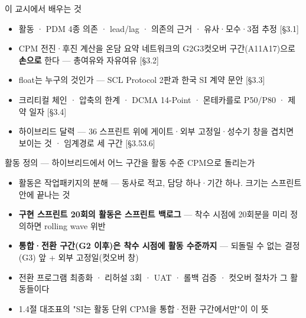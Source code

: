 \begin{frame}{이 교시에서 배우는 것}
\begin{itemize}
\item 활동 · PDM 4종 의존 · lead/lag · 의존의 근거 · 유사·모수·3점 추정 [§3.1]
\item CPM 전진·후진 계산을 온담 요약 네트워크의 G2\ra{}G3\ra{}컷오버 구간(A11\til{}A17)으로 \textbf{손으로} 한다 — 총여유와 자유여유 [§3.2]
\item float는 누구의 것인가 — SCL Protocol 2판과 한국 SI 계약 문안 [§3.3]
\item 크리티컬 체인 · 압축의 한계 · DCMA 14-Point · 몬테카를로 P50/P80 · 제약 일자 [§3.4]
\item 하이브리드 달력 — 36 스프린트 위에 게이트·외부 고정일·성수기 창을 겹치면 보이는 것 · 임계경로 세 구간 [§3.5\til{}3.6]
\end{itemize}
\end{frame}

\begin{frame}{활동 정의 — 하이브리드에서 어느 구간을 활동 수준 CPM으로 돌리는가}
\begin{itemize}
\item 활동은 작업패키지의 분해 — 동사로 적고, 담당 하나·기간 하나. 크기는 스프린트 안에 끝나는 것
\item \textbf{구현 스프린트 20회의 활동은 스프린트 백로그} — 착수 시점에 20회분을 미리 정의하면 rolling wave 위반
\item \textbf{통합·전환 구간(G2 이후)은 착수 시점에 활동 수준까지} — 되돌릴 수 없는 결정(G3) 앞 + 외부 고정일(컷오버 창)
\item 전환 프로그램 최종화 · 리허설 3회 · UAT · 롤백 검증 · 컷오버 절차가 그 활동들이다
\item 1.4절 대조표의 "SI는 활동 단위 CPM을 통합·전환 구간에서만"이 이 뜻
\end{itemize}
\end{frame}

